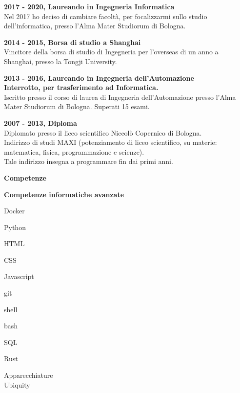 \documentclass[a4paper,12pt,final]{memoir}
\newcommand{\Sep}{\vspace{1.5em}}
\newcommand{\SmallSep}{\vspace{0.5em}}
\newcommand{\CVSection}[1]
	{\Large\textbf{#1}\par
	\SmallSep\normalsize\normalfont}
\newcommand{\CVItem}[1]
	{\textbf{\color{RoyalBlue} #1}}
\begin{document}
\CVItem{2017 - 2020, Laureando in Ingegneria Informatica}\\
	Nel 2017 ho deciso di cambiare facoltà, per focalizzarmi sullo studio dell'informatica, presso l'Alma Mater Studiorum di Bologna.
\SmallSep

\CVItem{2014 - 2015, Borsa di studio a Shanghai}\\
	Vincitore della borsa di studio di Ingegneria per l'overseas di un anno a Shanghai, presso la Tongji University.
\SmallSep

\CVItem{2013 - 2016, Laureando in Ingegneria dell'Automazione}\\
	\textbf{Interrotto, per trasferimento ad Informatica.}\\
	Iscritto presso il corso di laurea di Ingegneria dell'Automazione presso l'Alma Mater Studiorum di Bologna.
	Superati 15 esami. 
\SmallSep

\clearpage
\framebreak
\framebreak

\CVItem{2007 - 2013, Diploma}\\
	Diplomato presso il liceo scientifico Niccolò Copernico di Bologna.\\
	Indirizzo di studi MAXI (potenziamento di liceo scientifico, su materie: matematica, fisica, programmazione e scienze).\\
	Tale indirizzo insegna a programmare fin dai primi anni. 
\Sep

\CVSection{Competenze}
\CVItem{Competenze informatiche avanzate}
\begin{multicols}{3}
\begin{compactitem}[\color{RoyalBlue}$\circ$]
	\item Docker
	\item Python 
	\item HTML
	\item CSS
	\item Javascript
	\item git
	\item shell
	\item bash
	\item SQL
	\item Rust
	\item Apparecchiature \\ Ubiquity
\end{compactitem}
\end{multicols}
\SmallSep
\end{document}
